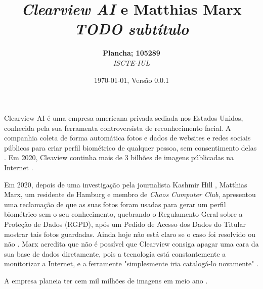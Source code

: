 \documentclass[portuguese, 12pt]{../diazessay}
\title{\textbf{\textit{Clearview AI} e Matthias Marx} \\ {\Large\itshape TODO subtítulo}}
\author{\textbf{Plancha; 105289} \\ \textit{ISCTE-IUL}}
\date{\today , Versão 0.0.1}
\begin{document}
\maketitle
Clearview AI é uma empresa americana privada sediada nos Estados Unidos, conhecida pela sua ferramenta controversista \parencite{nytClearview, CVBan} de reconhecimento facial. A companhia coleta de forma automática fotos e dados de websites e redes sociais públicos para criar perfil biométrico de qualquer pessoa, sem consentimento delas \parencite{EUpresp}. Em 2020, Cleaview continha mais de 3 bilhões de imagens públicadas na Internet \parencite{EUpresp}.

Em 2020, depois de uma investigação pela journalista Kashmir Hill \citeyear{nytClearview}, Matthias Marx, um residente de Hamburg e membro de \textit{Chaos Cumputer Club}\parencite{LegalComp}, apresentou uma reclamação de que as suas fotos foram usadas para gerar um perfil biométrico sem o seu conhecimento, quebrando o Regulamento Geral sobre a Proteção de Dados (RGPD), após um Pedido de Acesso dos Dados do Titular mostrar tais fotos guardadas. Ainda hoje não está claro se o caso foi resolvido ou não \parencite{wired}. Marx acredita que não é possível que Clearview consiga apagar uma cara da sua base de dados diretamente, pois a tecnologia está constantemente a monitorizar a Internet, e a ferramente "simplesmente iria catalogá-lo novamente" \parencite{wired}.

A empresa planeia ter cem mil milhões de imagens em meio ano \parencite{expansion}.


\printbibliography[title=Referências]
\end{document}
